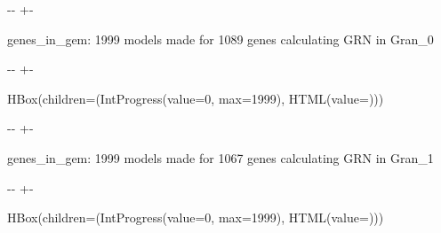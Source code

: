\documentclass[letterpaper,10pt,english]{sphinxmanual}
\newlength\nbsphinxcodecellspacing
\begin{document}
%
{
\kern-\sphinxverbatimsmallskipamount\kern-\baselineskip
\kern+\FrameHeightAdjust\kern-\fboxrule
\vspace{\nbsphinxcodecellspacing}
%
\begin{sphinxVerbatim}[commandchars=\\\{\}]

genes\_in\_gem: 1999
models made for 1089 genes
calculating GRN in Gran\_0
\end{sphinxVerbatim}
}
\relax

{

\kern-\sphinxverbatimsmallskipamount\kern-\baselineskip
\kern+\FrameHeightAdjust\kern-\fboxrule
\vspace{\nbsphinxcodecellspacing}

%
\begin{sphinxVerbatim}[commandchars=\\\{\}]
HBox(children=(IntProgress(value=0, max=1999), HTML(value=\PYGZsq{}\PYGZsq{})))
\end{sphinxVerbatim}
}



%
{
\kern-\sphinxverbatimsmallskipamount\kern-\baselineskip
\kern+\FrameHeightAdjust\kern-\fboxrule
\vspace{\nbsphinxcodecellspacing}
%
\begin{sphinxVerbatim}[commandchars=\\\{\}]

genes\_in\_gem: 1999
models made for 1067 genes
calculating GRN in Gran\_1
\end{sphinxVerbatim}
}
\relax

{

\kern-\sphinxverbatimsmallskipamount\kern-\baselineskip
\kern+\FrameHeightAdjust\kern-\fboxrule
\vspace{\nbsphinxcodecellspacing}

%
\begin{sphinxVerbatim}[commandchars=\\\{\}]
HBox(children=(IntProgress(value=0, max=1999), HTML(value=\PYGZsq{}\PYGZsq{})))
\end{sphinxVerbatim}
}
\end{document}
